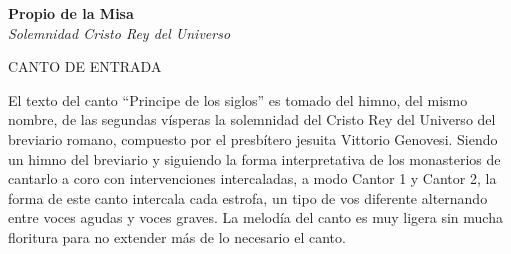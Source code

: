 \documentclass[12pt, letterpaper]{report}
\begin{document}


    \begin{center}
      \vspace*{8cm}
      \textbf{\Huge Propio de la Misa}\\
      \textit{ \Large Solemnidad Cristo Rey del Universo}
    \end{center}
    \clearpage

    \begin{center}
      {\large CANTO DE ENTRADA}
    \end{center}

    El texto del canto ``Principe de los siglos'' es tomado del himno, del mismo nombre, de las segundas v\'isperas la solemnidad del Cristo Rey del Universo del breviario romano, compuesto por el presb\'itero jesuita Vittorio Genovesi. Siendo un himno del breviario y siguiendo la forma interpretativa de los monasterios de cantarlo a coro con intervenciones intercaladas, a modo Cantor 1 y Cantor 2, la forma de este canto intercala cada estrofa, un tipo de vos diferente alternando entre voces agudas y voces graves. La melod\'ia del canto es muy ligera sin mucha floritura para no extender m\'as de lo necesario el canto.
\end{document}
